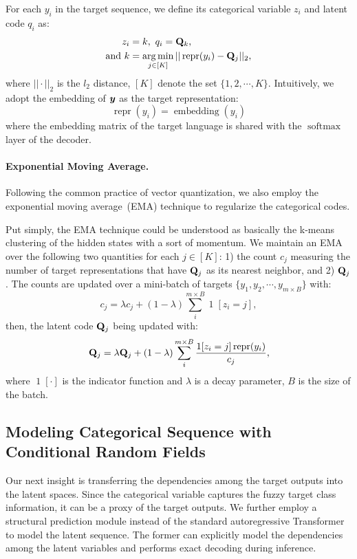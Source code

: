 For each $y_i$ in the target sequence, we define its categorical variable $z_i$ and latent code $q_i$ as:
\begin{equation}
\begin{split}
    z_i &= k,\ q_i = \mathbf{Q}_k, \\
\text{and}\ k & =\operatorname*{arg\,min}_{j\in [K]} || \operatorname{repr}(y_i) - \mathbf{Q}_j ||_{2},
\end{split}
\label{eqn:vq}
\end{equation}
where $||\cdot||_{2}$ is the ${l}_2$ distance, $[K]$ denote the set $\{1,2,\cdots,K\}$.
Intuitively, we adopt the embedding of $\bm y$ as the target representation:
\begin{equation*}
    \operatorname{repr}(y_i) = \operatorname{embedding}(y_i)
\end{equation*}
where the embedding matrix of the target language is shared with the $\operatorname{softmax}$ layer of the decoder.

\paragraph{Exponential Moving Average.} 
Following the common practice of vector quantization, we also employ the exponential moving average~(EMA) technique to regularize the categorical codes. 

Put simply, the EMA technique could be understood as basically the k-means clustering of the hidden states with a sort of momentum.  
We maintain an EMA over the following two quantities for each $j \in [K]$: 1) the count $c_j$ measuring the number of target representations that have $\mathbf{Q}_j$ as its nearest neighbor, and 2) $\mathbf{Q}_j$. 
The counts are updated over a mini-batch of targets $\{y_1, y_2,\cdots,y_{m\times B}\}$ with:
\begin{equation}
    c_j  = \lambda c_j + (1-\lambda) \sum_{i}^{m\times B} \operatorname{1}[z_i=j],
    \label{eqn:ema_c}
\end{equation}
then, the latent code $\mathbf{Q}_j$ being updated with:
\begin{equation}
    \mathbf{Q}_j = \lambda \mathbf{Q}_j + (1-\lambda)\sum_{i}^{m\times B}\frac{\operatorname{1}[z_i=j]\operatorname{repr}(y_i)}{c_j},
    \label{eqn:ema_q}
\end{equation}
where $\operatorname{1}[\cdot]$ is the indicator function and $\lambda$ is a decay parameter, $B$ is the size of the batch.


\subsection{Modeling Categorical Sequence with Conditional Random Fields}\label{ss:crf}
Our next insight is transferring the dependencies among the target outputs into the latent spaces. 
Since the categorical variable captures the fuzzy target class information, it can be a proxy of the target outputs. 
We further employ a structural prediction module instead of the standard autoregressive Transformer to model the latent sequence. 
The former can explicitly model the dependencies among the latent variables and performs exact decoding during inference.

